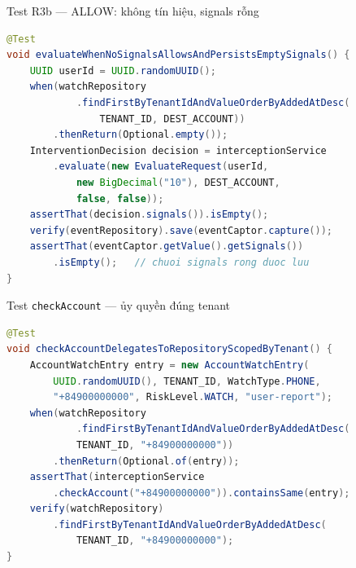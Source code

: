 \documentclass[aspectratio=169,12pt]{beamer}
\begin{document}
\begin{frame}[fragile]{Test R3b --- ALLOW: không tín hiệu, signals rỗng}
\begin{lstlisting}[language=java,basicstyle=\ttfamily\scriptsize]
@Test
void evaluateWhenNoSignalsAllowsAndPersistsEmptySignals() {
    UUID userId = UUID.randomUUID();
    when(watchRepository
            .findFirstByTenantIdAndValueOrderByAddedAtDesc(
                TENANT_ID, DEST_ACCOUNT))
        .thenReturn(Optional.empty());
    InterventionDecision decision = interceptionService
        .evaluate(new EvaluateRequest(userId,
            new BigDecimal("10"), DEST_ACCOUNT,
            false, false));
    assertThat(decision.signals()).isEmpty();
    verify(eventRepository).save(eventCaptor.capture());
    assertThat(eventCaptor.getValue().getSignals())
        .isEmpty();   // chuoi signals rong duoc luu
}
\end{lstlisting}
\end{frame}

\begin{frame}[fragile]{Test \texttt{checkAccount} --- ủy quyền đúng tenant}
\begin{lstlisting}[language=java,basicstyle=\ttfamily\scriptsize]
@Test
void checkAccountDelegatesToRepositoryScopedByTenant() {
    AccountWatchEntry entry = new AccountWatchEntry(
        UUID.randomUUID(), TENANT_ID, WatchType.PHONE,
        "+84900000000", RiskLevel.WATCH, "user-report");
    when(watchRepository
            .findFirstByTenantIdAndValueOrderByAddedAtDesc(
            TENANT_ID, "+84900000000"))
        .thenReturn(Optional.of(entry));
    assertThat(interceptionService
        .checkAccount("+84900000000")).containsSame(entry);
    verify(watchRepository)
        .findFirstByTenantIdAndValueOrderByAddedAtDesc(
            TENANT_ID, "+84900000000");
}
\end{lstlisting}
\end{frame}
\end{document}
